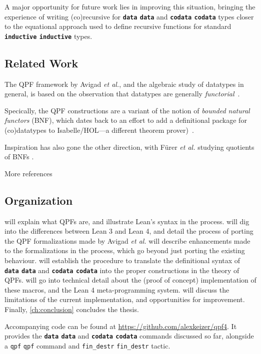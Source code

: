 \documentclass[titlepage]{report}
\newenvironment{todo}{%
\definecolor{shadecolor}{HTML}{F8E0E0}%
\begin{shaded}%
\begin{trivlist}                         
    \item[\hskip \labelsep {\bfseries Todo:}]}{\end{trivlist}\end{shaded}}
\newcommand\lean[1]{%
\ifx\leanmode\undefined%
\def\leanmode{1}%
\texttt{\small #1}%
\undef\leanmode%
\else%
\texttt{#1}%
\fi%
}
\newcommand\keyword[1]{{\color{keywordcolor} \textbf{\lean{#1}}}}
\newcommand\inductive{{\keyword{inductive}}}
\newcommand\data{\keyword{data}}
\newcommand\codata{\keyword{codata}}
\newcommand\etal{\emph{et al.}}
\begin{document}
A major opportunity for future work lies in improving this situation, bringing the experience of writing (co)recursive for \data{} and \codata{} types closer to the equational approach used to define recursive functions for standard \inductive{} types.



\subsection*{Related Work}
The QPF framework by Avigad \etal{}, and the algebraic study of datatypes in general, is based on the observation that datatypes are generally \emph{functorial}~\cite{avigadDataTypesQuotients2019a}.

Specically, the QPF constructions are a variant of the notion of \emph{bounded natural functors} (BNF), 
which dates back to an effort to add a definitional package for (co)datatypes to Isabelle/HOL---a different theorem prover)~\cite{biendarraDefiningCoDatatypes,traytelCategoryTheoryBased}.

Inspiration has also gone the other direction, with F\"urer \etal{} studying quotients of BNFs \cite{furerQuotientsBoundedNatural2022}.
\begin{todo}
    More references
\end{todo}


\subsection*{Organization}
 will explain what QPFs are, and illustrate Lean's syntax in the process.
 will dig into the differences between Lean 3 and Lean 4, and detail the process of porting the QPF formalizations made by Avigad \etal
{} will describe enhancements made to the formalizations in the process, which go beyond just porting the existing behaviour.
 will establish the procedure to translate the definitional syntax of \data{} and \codata{} into the proper constructions in the theory of QPFs.
 will go into technical detail about the (proof of concept)
implementation of these macros, and the Lean 4 meta-programming system.
 will discuss the limitations of the current implementation, and opportunities for improvement.
Finally, \cref{ch:conclusion} concludes the thesis.

Accompanying code can be found at \url{https://github.com/alexkeizer/qpf4}.
It provides the \data{} and \codata{} commands discussed so far, alongside a \lean{qpf} command and \lean{fin\_destr} tactic.
\end{document}
